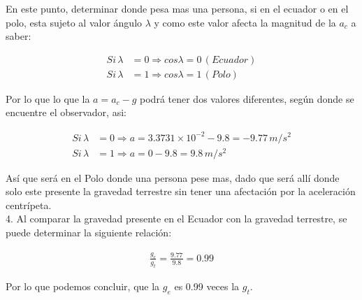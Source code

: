 \documentclass[11pt,letterpaper]{article}
\begin{document}
En este punto, determinar donde pesa mas una persona, si en el ecuador o en el polo, esta sujeto al valor ángulo $\lambda$ y como este valor afecta la magnitud de la $a_{c}$ a saber:

\begin{align*}	
Si\,\lambda &= 0 \Rightarrow cos \lambda = 0\,(Ecuador)\\
Si\,\lambda &= 1 \Rightarrow cos \lambda = 1\,(Polo)
\end{align*}

Por lo que lo que la $a = a_{c} - g$ podrá tener dos valores diferentes, según donde se encuentre el observador, asi:

\begin{align*}	
Si\,\lambda &= 0 \Rightarrow a = 3.3731 \times 10^{-2} - 9.8 = - 9.77\,m/s^2\\
Si\,\lambda &= 1 \Rightarrow a = 0 - 9.8 = 9.8\,m/s^2
\end{align*}

Así que será en el Polo donde una persona pese mas, dado que será allí donde solo este presente la gravedad terrestre sin tener una afectación por la aceleración centrípeta.\\

4. Al comparar la gravedad presente en el Ecuador con la gravedad terrestre, se puede determinar la siguiente relación:

\begin{align*}	
\frac{g_{e}}{g_{t}} = \frac{9.77}{9.8} = 0.99
\end{align*}

Por lo que podemos concluir, que la $g_{e}$ es 0.99 veces la $g_{t}$.

\end{document}
